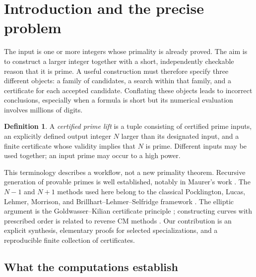 \documentclass[11pt,a4paper]{article}
\theoremstyle{definition}\newtheorem{definition}[theorem]{Definition}
\theoremstyle{remark}\newtheorem{remark}[theorem]{Remark}
\begin{document}
\clearpage
\begingroup\small\setcounter{tocdepth}{2}\setlength{\parskip}{0pt}\tableofcontents\endgroup
\clearpage

\section{Introduction and the precise problem}
\label{sec:intro}

The input is one or more integers whose primality is already proved. The aim is
to construct a larger integer together with a short, independently checkable
reason that it is prime. A useful construction must therefore specify three
different objects: a family of candidates, a search within that family, and a
certificate for each accepted candidate. Conflating these objects leads to
incorrect conclusions, especially when a formula is short but its numerical
evaluation involves millions of digits.

\begin{definition}
A \emph{certified prime lift} is a tuple consisting of certified prime inputs,
an explicitly defined output integer $N$ larger than its designated input, and
a finite certificate whose validity implies that $N$ is prime. Different
inputs may be used together; an input prime may occur to a high power.
\end{definition}

This terminology describes a workflow, not a new primality theorem. Recursive
generation of provable primes is well established, notably in Maurer's work
\cite{maurer}. The $N-1$ and $N+1$ methods used here belong to the classical
Pocklington, Lucas, Lehmer, Morrison, and Brillhart--Lehmer--Selfridge framework
\cite{pocklington,bls,morrison}. The elliptic argument is the
Goldwasser--Kilian certificate principle \cite{gk,sutherland}; constructing
curves with prescribed order is related to reverse CM methods
\cite{broker}. Our contribution is an explicit synthesis, elementary proofs
for selected specializations, and a reproducible finite collection of
certificates.

\subsection{What the computations establish}
\end{document}
